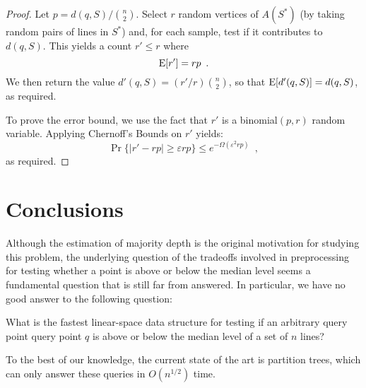 \documentclass{patmorin}
\newcommand{\eps}{\varepsilon}
\begin{document}
\begin{proof}
  Let $p=d(q,S)/\binom{n}{2}$.
  Select $r$ random vertices of $A(S^*)$ (by taking random pairs of lines
  in $S^*$) and, for each sample, test if it contributes to $d(q,S)$.  This
  yields a count $r' \le r$ where
  \[ 
     \mathrm{E}[r'] = rp \enspace .
  \]
  We then return the value $d'(q,S)=(r'/r)\binom{n}{2}$, so that
  $\mathrm{E}[d'(q,S)]=d(q,S)$, as required.

  To prove the error bound, we use the fact that $r'$ is a binomial$(p,r)$ random variable.  Applying Chernoff's Bounds on $r'$ yields:
  \[
     \Pr\{|r' - rp| \ge \eps rp\} \le e^{-\Omega(\eps^2rp)} \enspace ,
  \]
  as required.
\end{proof}

\section{Conclusions}

Although the estimation of majority depth is the original motivation for
studying this problem, the underlying question of the tradeoffs involved
in preprocessing for testing whether a point is above or below the median
level seems a fundamental question that is still far from answered.  In particular, we have no good answer to the following question:

\begin{op}
What is the fastest linear-space data structure for testing if an
arbitrary query point query point $q$ is above or below the median level
of a set of $n$ lines?
\end{op}

To the best of our knowledge, the current state of the art is partition
trees, which can only answer these queries in $O(n^{1/2})$ time.



\end{document}
